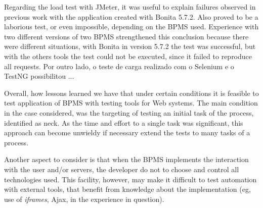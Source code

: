 \documentclass[runningheads,a4paper]{llncs}
\begin{document}
Regarding the load test with JMeter, it was useful to explain failures observed in previous work with the application created with Bonita 5.7.2. Also proved to be a laborious test, or even impossible, depending on the BPMS used. Experience with two different versions of two BPMS strengthened this conclusion because there were different situations, with Bonita in version 5.7.2 the test was successful, but with the others tools the test could not be executed, since it failed to reproduce all requests. 
Por outro lado, o teste de carga realizado com o Selenium e o TestNG possibilitou ...


Overall, how lessons learned we have that under certain conditions it is feasible to test application of BPMS with testing tools for Web systems. The main condition in the case considered, was the targeting of testing an initial task of the process, identified as neck. As the time and effort to a single task was significant, this approach can become unwieldy if necessary extend the tests to many tasks of a process.

Another aspect to consider is that when the BPMS implements the interaction with the user and/or servers, the developer do not to choose and control all technologies used. This facility, however, may make it difficult to test automation with external tools, that benefit from knowledge about the implementation (eg, use of \emph{iframes}, Ajax, in the experience in question).

\end{document}
